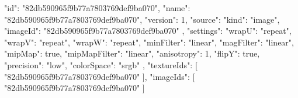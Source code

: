 {
  "id": "82db590965f9b77a7803769def9ba070",
  "name": "82db590965f9b77a7803769def9ba070",
  "version": 1,
  "source": {
    "kind": "image",
    "imageId": "82db590965f9b77a7803769def9ba070"
  },
  "settings": {
    "wrapU": "repeat",
    "wrapV": "repeat",
    "wrapW": "repeat",
    "minFilter": "linear",
    "magFilter": "linear",
    "mipMap": true,
    "mipMapFilter": "linear",
    "anisotropy": 1,
    "flipY": true,
    "precision": "low",
    "colorSpace": "srgb"
  },
  "textureIds": [
    "82db590965f9b77a7803769def9ba070"
  ],
  "imageIds": [
    "82db590965f9b77a7803769def9ba070"
  ]
}
